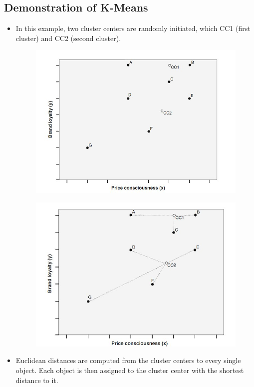 \documentclass[a4paper,12pt]{article}
\begin{document}
\newpage
\subsection{Demonstration of K-Means}

\begin{itemize}
\item In this example, two cluster centers are randomly
initiated, which CC1 (first cluster) and CC2 (second cluster).
\begin{figure}[h!]
	\begin{center}
		\includegraphics[scale=0.4]{images/kmeans1.jpg}\\
	\end{center}
\end{figure}
\begin{figure}[h!]
	\begin{center}
		\includegraphics[scale=0.4]{images/kmeans2.jpg}\\
	\end{center}
\end{figure}
\item Euclidean distances are computed from the cluster
centers to every single object. Each object is then assigned to the cluster center with
the shortest distance to it.


\end{itemize}
\end{document}
